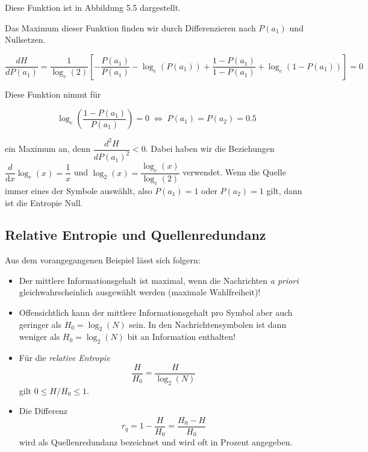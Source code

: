 Diese Funktion ist in Abbildung 5.5 dargestellt.

\begin{beweis}
Das Maximum dieser Funktion finden wir durch Differenzieren nach $P(a_1)$ und Nullsetzen.

$$
\frac{dH}{dP(a_1)} = \frac{1}{\log_e(2)}\left[-\frac{P(a_1)}{P(a_1)} - \log_e(P(a_1)) + \frac{1-P(a_1)}{1-P(a_1)} + \log_e(1-P(a_1))\right] = 0
$$

Diese Funktion nimmt für

$$
\log_e\!\left(\frac{1-P(a_1)}{P(a_1)}\right) = 0 \;\Leftrightarrow\; P(a_1) = P(a_2) = 0.5
$$

ein Maximum an, denn $\dfrac{d^2H}{dP(a_1)^2} < 0$. Dabei haben wir die Beziehungen $\dfrac{d}{\mathrm{d}x}\log_e(x) = \dfrac{1}{x}$ und $\log_2(x) = \dfrac{\log_e(x)}{\log_e(2)}$ verwendet. Wenn die Quelle immer eines der Symbole auswählt, also $P(a_1) = 1$ oder $P(a_2) = 1$ gilt, dann ist die Entropie Null.
\end{beweis}


\subsection{Relative Entropie und Quellenredundanz}
\label{sec:relative-entropie}

Aus dem vorangegangenen Beispiel lässt sich folgern:

\begin{itemize}
  \item Der mittlere Informationsgehalt ist maximal, wenn die Nachrichten \textit{a priori} gleichwahrscheinlich ausgewählt werden (maximale Wahlfreiheit)!

  \item Offensichtlich kann der mittlere Informationsgehalt pro Symbol aber auch geringer als $H_0 = \log_2(N)$ sein. In den Nachrichtensymbolen ist dann weniger als $H_0 = \log_2(N)$ bit an Information enthalten!

  \item Für die \textit{relative Entropie}
$$
\frac{H}{H_0} = \frac{H}{\log_2(N)}
$$
gilt $0 \leq H/H_0 \leq 1$.

  \item Die Differenz
$$
r_q = 1 - \frac{H}{H_0} = \frac{H_0 - H}{H_0}
$$
wird als Quellenredundanz bezeichnet und wird oft in Prozent angegeben.
\end{itemize}

